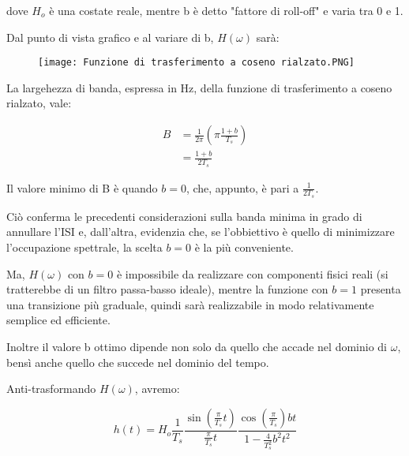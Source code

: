 dove $H_o$ è una costate reale, mentre b è detto "fattore di roll-off" e varia tra 0 e 1. \newline 

Dal punto di vista grafico e al variare di b, $H(\omega)$ sarà: 

\begin{figure}[h]
    \centering
    \texttt{[image: Funzione di trasferimento a coseno rialzato.PNG]}
\end{figure}

La largehezza di banda, espressa in Hz, della funzione di trasferimento a coseno rialzato, vale: 

{
    \Large 
    \begin{equation}
        \begin{split}
            B 
            &= 
            \frac{1}{2 \pi}
            (\pi \frac{1 + b}{T_s}) 
            \\
            &= 
            \frac{1 + b}{2 T_s}
        \end{split}
    \end{equation}
}

Il valore minimo di B è quando $b=0$, che, appunto, è pari a $\frac{1}{2T_s}$. \newline 

Ciò conferma le precedenti considerazioni sulla banda minima in grado di annullare l'ISI e, dall'altra, 
evidenzia che, se l'obbiettivo è quello di minimizzare l'occupazione spettrale, la scelta $b=0$ è la più conveniente. \newline 

Ma, $H(\omega)$ con $b=0$ è impossibile da realizzare con componenti fisici reali (si tratterebbe di un filtro passa-basso ideale), 
mentre la funzione con $b=1$ presenta una transizione più graduale, quindi sarà realizzabile in modo relativamente semplice ed efficiente. \newline 

Inoltre il valore b ottimo dipende non solo da quello che accade nel dominio di $\omega$, 
bensì anche quello che succede nel dominio del tempo. \newline 

Anti-trasformando $H(\omega)$, avremo: 

{
    \Large 
    \begin{equation}
    h(t) 
    = 
    H_o 
    \frac{1}{T_s} 
    \frac{\sin(\frac{\pi}{T_s} t)}{\frac{\pi}{T_s} t}
    \frac{\cos(\frac{\pi}{T_s}) bt}{1 - \frac{4}{T_s ^{2} }b^{2} t^{2}}         
    \end{equation}
}

